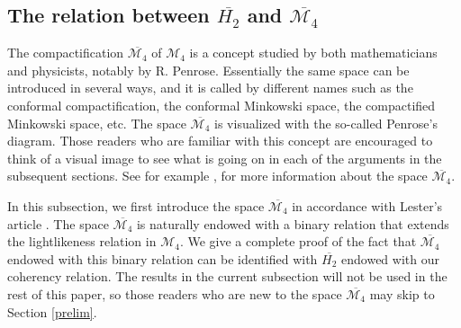 \documentclass[10pt]{amsart}
\theoremstyle{definition}
\theoremstyle{remark}
\numberwithin{subsection}{section}
\numberwithin{equation}{section}
\newcommand\oH{{\overline{H_2}}}
\begin{document}
\subsection{The relation between $\oH$ and $\overline{\mathcal{M}_4}$}\label{ohm4}
The compactification $\overline{\mathcal{M}_4}$  of $\mathcal{M}_4$ is a concept studied by both mathematicians and physicists, notably by R. Penrose. 
Essentially the same space can be introduced in several ways, and it is called by different names such as the conformal compactification, the conformal Minkowski space, the compactified Minkowski space, etc.
The space $\overline{\mathcal{M}_4}$ is visualized with the so-called Penrose's diagram. 
Those readers who are familiar with this concept are encouraged to think of a visual image to see what is going on in each of the arguments in the subsequent sections. 
See for example  \cite[Section 5.1]{HaE}, \cite{Pe} for more information about the space $\overline{\mathcal{M}_4}$.  

In this subsection, we first introduce the space $\overline{\mathcal{M}_4}$ in accordance with Lester's article \cite{Les0}.
The space $\overline{\mathcal{M}_4}$ is naturally endowed with a binary relation that extends the lightlikeness relation in $\mathcal{M}_4$.
We give a complete proof of the fact that $\overline{\mathcal{M}_4}$ endowed with this binary relation can be identified with $\oH$ endowed with our coherency relation.
The results in the current subsection will not be used in the rest of this paper, so those readers who are new to the space $\overline{\mathcal{M}_4}$ may skip to Section \ref{prelim}.
\end{document}
